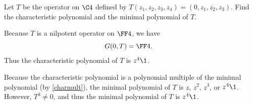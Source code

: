 \exercise
Let $T$ be the operator on $\C4$ defined by
$
T(z_1, z_2, z_3, z_4) = (0, z_1, z_2, z_3)$.
Find the characteristic polynomial and the minimal polynomial of $T$.

\begin{Solution}
Because $T$ is a nilpotent operator on $\FF4$, we have
\[
G(0, T) = \FF4.
\]
Thus the characteristic polynomial of $T$ is $z^4\1$.

Because the characteristic polynomial is a polynomial multiple of the minimal polynomial (by \ref{charmult}), the minimal polynomial of $T$ is $z$, $z^2$, $z^3$, or $z^4\1$. However, $T^3 \ne 0$, and thus the minimal polynomial of $T$ is $z^4\1$.
\end{Solution}

